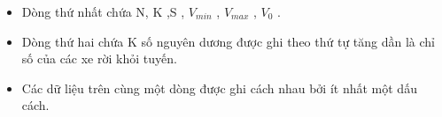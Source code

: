 \begin{itemize}
	\item     Dòng thứ nhất chứa N, K ,S , $V_{min}$    , $V_{max}$    , $V_{0}$    .   
	\item     Dòng thứ hai chứa K số nguyên dương được ghi theo thứ tự tăng dần là chỉ số của các xe rời khỏi tuyến.   
	\item     Các dữ liệu trên cùng một dòng được ghi cách nhau bởi ít nhất một dấu cách.   
\end{itemize}